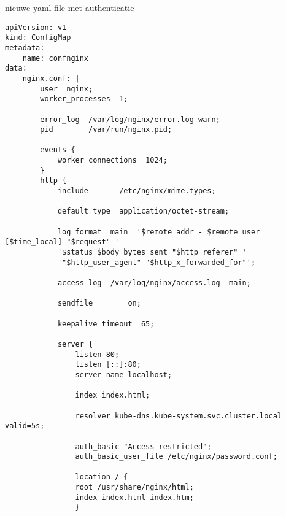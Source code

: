 nieuwe yaml file met authenticatie
\begin{lstlisting}
apiVersion: v1
kind: ConfigMap
metadata:
    name: confnginx
data:
    nginx.conf: |
        user  nginx;
        worker_processes  1;

        error_log  /var/log/nginx/error.log warn;
        pid        /var/run/nginx.pid;

        events {
            worker_connections  1024;
        }
        http {
            include       /etc/nginx/mime.types;
    
            default_type  application/octet-stream;
    
            log_format  main  '$remote_addr - $remote_user [$time_local] "$request" '
            '$status $body_bytes_sent "$http_referer" '
            '"$http_user_agent" "$http_x_forwarded_for"';
    
            access_log  /var/log/nginx/access.log  main;
    
            sendfile        on;
    
            keepalive_timeout  65;
    
            server {
                listen 80;
                listen [::]:80;
                server_name localhost;
        
                index index.html;
        
                resolver kube-dns.kube-system.svc.cluster.local valid=5s;
        
                auth_basic "Access restricted";
                auth_basic_user_file /etc/nginx/password.conf;
        
                location / {
                root /usr/share/nginx/html;
                index index.html index.htm;
                }
        

\end{lstlisting}
